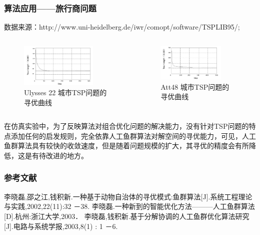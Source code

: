 \begin{frame}
	\frametitle{算法应用——旅行商问题}	
	\small{数据来源：http://www.uni-heidelberg.de/iwr/comopt/software/TSPLIB95/;}
	\begin{columns}
		\begin{figure}
			\centering
			\includegraphics[width=0.8\textwidth]{pic/fish4.png}
			\caption{Ulysses 22 城市TSP问题的寻优曲线}
		\end{figure}
		\begin{figure}
			\centering
			\includegraphics[width=0.8\textwidth]{pic/fish5.png}
			\caption{Att48 城市TSP问题的寻优曲线}
		\end{figure}
	\end{columns}
	\small{在仿真实验中，为了反映算法对组合优化问题的解决能力，没有针对TSP问题的特点添加任何的启发规则，完全依靠人工鱼群算法对解空间的寻优能力，可见，人工鱼群算法具有较快的收敛速度，但是随着问题规模的扩大，其寻优的精度会有所降低，这是有待改进的地方。}
	
\end{frame}

\begin{frame}
	\frametitle{参考文献}
	\begin{thebibliography}{123} 
	 李晓磊,邵之江,钱积新.一种基于动物自治体的寻优模式:鱼群算法[J].系统工程理论与实践,2002,22(11):32 －38.
	 李晓磊.一种新到的智能优化方法———人工鱼群算法[D].杭州:浙江大学,2003．
	李晓磊,钱积新.基于分解协调的人工鱼群优化算法研究[J].电路与系统学报,2003,8(1) : 1 －6.
	\end{thebibliography}
\end{frame}
